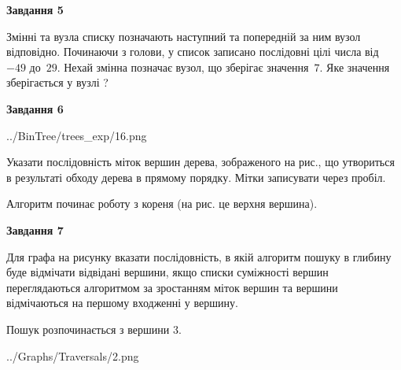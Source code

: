 \documentclass[12pt, ukrainian]{article}
\begin{document}
{\begin {large}
{\begin {center}\textbf{Завдання 5}\end {center}}\par
Змінні  та  вузла списку позначають наступний та попередній за ним вузол відповідно. Починаючи з голови, у список записано послідовні цілі числа від~$-49$ до~$29$. Нехай змінна  позначає вузол, що зберігає значення~$7$.
Яке значення зберігається у вузлі  ?\par
\newpage

{\begin {center}\textbf{Завдання 6}\end {center}}\par

\begin{center}
	{../BinTree/trees_exp/16.png}
\end{center}
Указати послідовність міток вершин дерева, зображеного на рис., що утвориться в результаті обходу дерева в прямому порядку. Мітки записувати через пробіл.\par Алгоритм починає роботу з кореня (на рис. це верхня вершина).\par
\newpage

{\begin {center}\textbf{Завдання 7}\end {center}}\par
Для графа на рисунку вказати послідовність, в якій алгоритм пошуку в глибину буде відмічати відвідані вершини, якщо списки суміжності вершин переглядаються алгоритмом за зростанням міток вершин та вершини відмічаються на першому вход\-женні у вершину.\par
Пошук розпочинається з вершини 3.\par

\begin{center}
	{../Graphs/Traversals/2.png}
\end{center}\par
\newpage


\end{large}}
\end{document}
